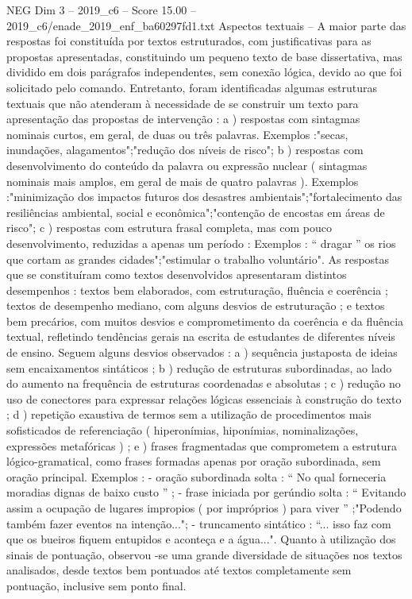 \begin{textsample}{NEG Dim 3 – 2019\_c6 – Score 15.00 – 2019\_c6/enade\_2019\_enf\_ba60297fd1.txt}
Aspectos textuais – A maior parte das respostas foi constituída por textos estruturados, com justificativas para as propostas apresentadas, constituindo um pequeno texto de base dissertativa, mas dividido em dois parágrafos independentes, sem conexão lógica, devido ao que foi solicitado pelo comando.
Entretanto, foram identificadas algumas estruturas textuais que não atenderam à necessidade de se construir um texto para apresentação das propostas de intervenção : a ) respostas com sintagmas nominais curtos, em geral, de duas ou três palavras.
Exemplos :"secas, inundações, alagamentos";"redução dos níveis de risco"; b ) respostas com desenvolvimento do conteúdo da palavra ou expressão nuclear ( sintagmas nominais mais amplos, em geral de mais de quatro palavras ).
Exemplos :"minimização dos impactos futuros dos desastres ambientais";"fortalecimento das resiliências ambiental, social e econômica";"contenção de encostas em áreas de risco"; c ) respostas com estrutura frasal completa, mas com pouco desenvolvimento, reduzidas a apenas um período : Exemplos : “ dragar ” os rios que cortam as grandes cidades";"estimular o trabalho voluntário".
As respostas que se constituíram como textos desenvolvidos apresentaram distintos desempenhos : textos bem elaborados, com estruturação, fluência e coerência ; textos de desempenho mediano, com alguns desvios de estruturação ; e textos bem precários, com muitos desvios e comprometimento da coerência e da fluência textual, refletindo tendências gerais na escrita de estudantes de diferentes níveis de ensino.
Seguem alguns desvios observados : a ) sequência justaposta de ideias sem encaixamentos sintáticos ; b ) redução de estruturas subordinadas, ao lado do aumento na frequência de estruturas coordenadas e absolutas ; c ) redução no uso de conectores para expressar relações lógicas essenciais à construção do texto ; d ) repetição exaustiva de termos sem a utilização de procedimentos mais sofisticados de referenciação ( hiperonímias, hiponímias, nominalizações, expressões metafóricas ) ; e ) frases fragmentadas que comprometem a estrutura lógico-gramatical, como frases formadas apenas por oração subordinada, sem oração principal.
Exemplos : - oração subordinada solta : “ No qual forneceria moradias dignas de baixo custo ” ; - frase iniciada por gerúndio solta : “ Evitando assim a ocupação de lugares impropios ( por impróprios ) para viver ” ;"Podendo também fazer eventos na intenção..."; - truncamento sintático : “... isso faz com que os bueiros fiquem entupidos e aconteça e a água...".
Quanto à utilização dos sinais de pontuação, observou -se uma grande diversidade de situações nos textos analisados, desde textos bem pontuados até textos completamente sem pontuação, inclusive sem ponto final.

\end{textsample}
